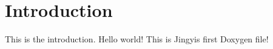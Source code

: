 \hypertarget{index_intro_sec}{}\section{Introduction}\label{index_intro_sec}
This is the introduction. Hello world! This is Jingyi\textquotesingle{}s first Doxygen file! 